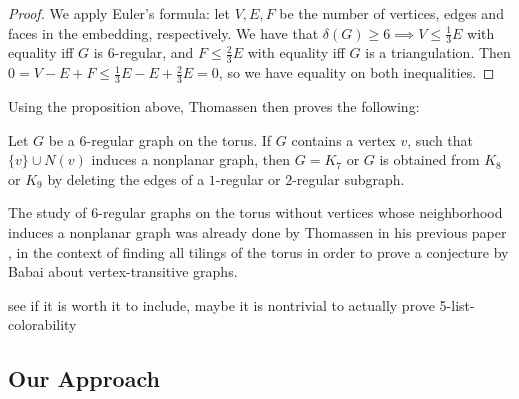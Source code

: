 \begin{proof}
We apply Euler's formula: let $V, E, F$ be the number of vertices, edges and faces in the embedding, respectively. 
We have that $\delta(G) \geq 6 \implies V \leq \frac{1}{3} E$ with equality iff $G$ is $6$-regular, and $F \leq \frac{2}{3}E$ 
with equality iff $G$ is a triangulation. Then $0 = V - E + F \leq \frac{1}{3}E - E + \frac{2}{3}E = 0$, so we have equality on both inequalities.
\end{proof}

Using the proposition above, Thomassen then proves the following:

\begin{proposition}
Let $G$ be a $6$-regular graph on the torus. If $G$ contains a vertex $v$, such that $\{v\} \cup N(v)$ induces a nonplanar graph, then $G = K_7$ or $G$ is obtained from $K_8$ or $K_9$ by deleting the edges of a $1$-regular or $2$-regular subgraph.
\end{proposition}

The study of $6$-regular graphs on the torus without vertices whose neighborhood induces a nonplanar graph was already done by Thomassen in his previous paper \cite{thomassentilings}, in the context of finding all tilings of the torus in order to prove a conjecture by Babai about vertex-transitive graphs. 


 see if it is worth it to include, maybe it is nontrivial to actually prove 5-list-colorability




\subsection{Our Approach}
